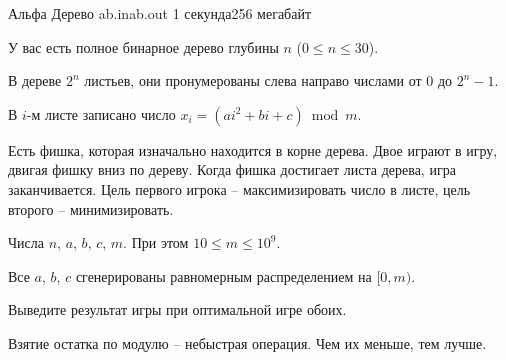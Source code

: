 
\begin{problem}{Альфа Дерево}
{ab.in}{ab.out}
{1 секунда}{256 мегабайт}{}

У вас есть полное бинарное дерево глубины $n$ ($0 \le n \le 30$).

В дереве $2^n$ листьев, они пронумерованы слева направо числами от $0$ до $2^n{-}1$.

В $i$-м листе записано число $x_i = (a i^2 + b i + c) \bmod m$. %

Есть фишка, которая изначально находится в корне дерева. Двое играют в игру, двигая фишку вниз по дереву.
Когда фишка достигает листа дерева, игра заканчивается. Цель первого игрока -- максимизировать число в листе, цель второго -- минимизировать.

\InputFile

Числа $n$, $a$, $b$, $c$, $m$. При этом $10 \le m \le 10^9$.

Все $a$, $b$, $c$ сгенерированы равномерным распределением на $[0, m)$.

\OutputFile

Выведите результат игры при оптимальной игре обоих.

\Examples

\begin{example}
%
\end{example}

\Note

Взятие остатка по модулю -- небыстрая операция. Чем их меньше, тем лучше.

\end{problem}
